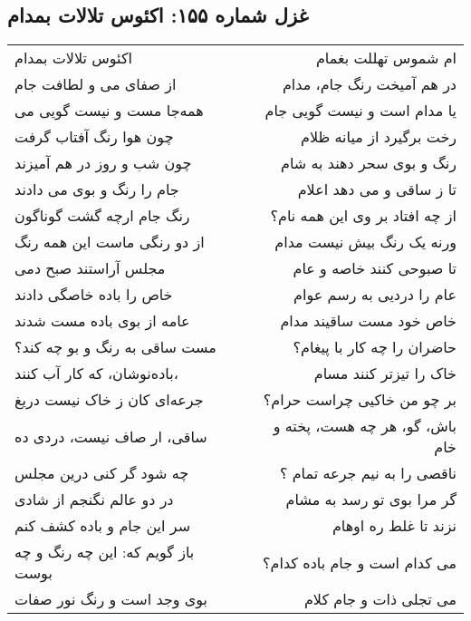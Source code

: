 \begin{center}
\section*{غزل شماره ۱۵۵: اکئوس تلالات بمدام}
\label{sec:155}
\begin{longtable}{l p{0.5cm} r}
اکئوس تلالات بمدام
&&
ام شموس تهللت بغمام
\\
از صفای می و لطافت جام
&&
در هم آمیخت رنگ جام، مدام
\\
همه‌جا مست و نیست گویی می
&&
یا مدام است و نیست گویی جام
\\
چون هوا رنگ آفتاب گرفت
&&
رخت برگیرد از میانه ظلام
\\
چون شب و روز در هم آمیزند
&&
رنگ و بوی سحر دهند به شام
\\
جام را رنگ و بوی می دادند
&&
تا ز ساقی و می دهد اعلام
\\
رنگ جام ارچه گشت گوناگون
&&
از چه افتاد بر وی این همه نام؟
\\
از دو رنگی ماست این همه رنگ
&&
ورنه یک رنگ بیش نیست مدام
\\
مجلس آراستند صبح دمی
&&
تا صبوحی کنند خاصه و عام
\\
خاص را باده خاصگی دادند
&&
عام را دردیی به رسم عوام
\\
عامه از بوی باده مست شدند
&&
خاص خود مست ساقیند مدام
\\
مست ساقی به رنگ و بو چه کند؟
&&
حاضران را چه کار با پیغام؟
\\
باده‌نوشان، که کار آب کنند،
&&
خاک را تیزتر کنند مسام
\\
جرعه‌ای کان ز خاک نیست دریغ
&&
بر چو من خاکیی چراست حرام؟
\\
ساقی، ار صاف نیست، دردی ده
&&
باش، گو، هر چه هست، پخته و خام
\\
چه شود گر کنی درین مجلس
&&
ناقصی را به نیم جرعه تمام ؟
\\
در دو عالم نگنجم از شادی
&&
گر مرا بوی تو رسد به مشام
\\
سر این جام و باده کشف کنم
&&
نزند تا غلط ره اوهام
\\
باز گویم که: این چه رنگ و چه بوست
&&
می کدام است و جام باده کدام؟
\\
بوی وجد است و رنگ نور صفات
&&
می تجلی ذات و جام کلام
\\
\end{longtable}
\end{center}
